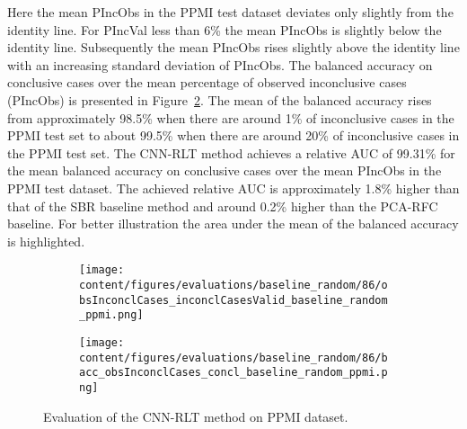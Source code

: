 Here the mean PIncObs in the PPMI test dataset deviates only slightly from the identity line.
For PIncVal less than 6\% the mean PIncObs is slightly below the identity line.
Subsequently the mean PIncObs rises slightly above the identity line with an increasing standard deviation of PIncObs.
The balanced accuracy on conclusive cases over the mean percentage of observed inconclusive cases (PIncObs) is presented 
in Figure~\ref{fig:bacc_obsInconclCases_concl_baseline_random_ppmi}.
The mean of the balanced accuracy rises from approximately 98.5\% 
when there are around 1\% of inconclusive cases in the PPMI test set to about 99.5\% 
when there are around 20\% of inconclusive cases in the PPMI test set.
The CNN-RLT method achieves a relative AUC of 99.31\% for the mean balanced accuracy on conclusive cases 
over the mean PIncObs in the PPMI test dataset.
The achieved relative AUC is approximately 1.8\% higher than that of the SBR baseline method 
and around 0.2\% higher than the PCA-RFC baseline.
For better illustration the area under the mean of the balanced accuracy is highlighted.


\begin{figure}[ht]
  \begin{subfigure}{0.9\textwidth}
    \centering
    \texttt{[image: content/figures/evaluations/baseline\_random/86/obsInconclCases\_inconclCasesValid\_baseline\_random\_ppmi.png]}
    \label{fig:obsInconclCases_inconclCasesValid_baseline_random_ppmi}
  \end{subfigure}
  \hfill
  \begin{subfigure}{0.9\textwidth}
    \centering
    \texttt{[image: content/figures/evaluations/baseline\_random/86/bacc\_obsInconclCases\_concl\_baseline\_random\_ppmi.png]}
    \label{fig:bacc_obsInconclCases_concl_baseline_random_ppmi}
  \end{subfigure}
  \caption{Evaluation of the CNN-RLT method on PPMI dataset.}
  \label{fig:perf_eval_rlt_ppmi}
\end{figure}




